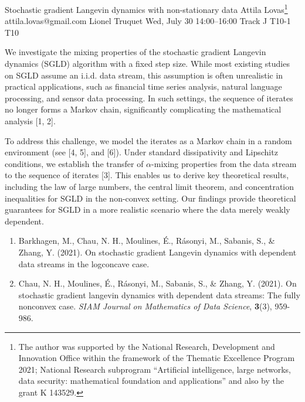 \begin{talk}
  {Stochastic gradient Langevin dynamics with non-stationary data}%
  {Attila Lovas\footnote{The author was supported by the National Research, Development and Innovation Office within the framework of the Thematic Excellence Program 2021; National Research subprogram “Artificial intelligence, large networks, data security: mathematical foundation and applications” and also by the grant K 143529.}}%
  {attila.lovas@gmail.com}%
  {Lionel Truquet}%
  {}%
  {}%
  {Wed, July 30 14:00–16:00 Track J}%
  {T10-1}%
  {T10}%
  
				
		
We investigate the mixing properties of the stochastic gradient Langevin dynamics (SGLD) algorithm with a fixed step size. While most existing studies on SGLD assume an i.i.d. data stream, this assumption is often unrealistic in practical applications, such as financial time series analysis, natural language processing, and sensor data processing. In such settings, the sequence of iterates no longer forms a Markov chain, significantly complicating the mathematical analysis [1, 2].

To address this challenge, we model the iterates as a Markov chain in a random environment (see [4, 5], and [6]). Under standard dissipativity and Lipschitz conditions, we establish the transfer of $\alpha$-mixing properties from the data stream to the sequence of iterates [3]. This enables us to derive key theoretical results, including the law of large numbers, the central limit theorem, and concentration inequalities for SGLD in the non-convex setting. Our findings provide theoretical guarantees for SGLD in a more realistic scenario where the data merely weakly dependent.
		
\medskip

\begin{enumerate}
	
	\item[{[1]}] Barkhagen, M., Chau, N. H., Moulines, \'E., R\'asonyi, M., Sabanis, S., \& Zhang, Y. (2021). On stochastic gradient Langevin dynamics with dependent data streams in the logconcave case.
	
	\item[{[2]}] Chau, N. H., Moulines, \'E., R\'asonyi, M., Sabanis, S., \& Zhang, Y. (2021). On stochastic gradient langevin dynamics with dependent data streams: The fully nonconvex case. {\it SIAM Journal on Mathematics of Data Science}, \textbf{3}(3), 959-986.
	

\end{enumerate}
\end{talk}
